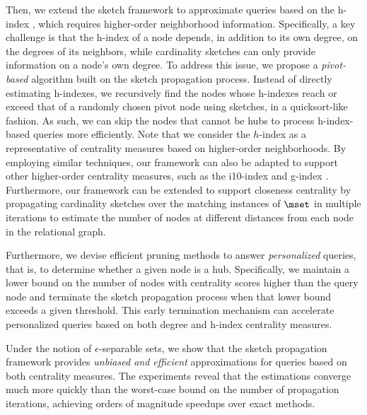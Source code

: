 Then, we extend the sketch framework to approximate \ced queries based on the h-index \cite{LuZZS16}, which requires higher-order neighborhood information. Specifically, a key challenge is that the h-index of a node depends, in addition to its own degree, on the degrees of its neighbors, while cardinality sketches can only provide information on a node's own degree. To address this issue, we propose a \emph{pivot-based} algorithm built on the sketch propagation process. Instead of directly estimating h-indexes, we recursively find the nodes whose h-indexes reach or exceed that of a randomly chosen pivot node using sketches, in a quicksort-like fashion. As such, we can skip the nodes that cannot be hubs to process h-index-based \ced queries more efficiently. Note that we consider the $h$-index as a representative of centrality measures based on higher-order neighborhoods. By employing similar techniques, our framework can also be adapted to support other higher-order centrality measures, such as the i10-index and g-index \cite{egghe2006theory}. Furthermore, our framework can be extended to support closeness centrality \cite{olsen2014efficient, bergamini2019computing} by propagating cardinality sketches over the matching instances of $\mset$ in multiple iterations to estimate the number of nodes at different distances from each node in the relational graph.

Furthermore, we devise efficient pruning methods to answer \emph{personalized} \ced queries, that is, to determine whether a given node is a hub. Specifically, we maintain a lower bound on the number of nodes with centrality scores higher than the query node and terminate the sketch propagation process when that lower bound exceeds a given threshold. This early termination mechanism can accelerate personalized \ced queries based on both degree and h-index centrality measures.

Under the notion of $\epsilon$-separable sets, we show that the sketch propagation framework provides \emph{unbiased and efficient} approximations for \ced queries based on both centrality measures. The experiments reveal that the estimations converge much more quickly than the worst-case bound on the number of propagation iterations, achieving orders of magnitude speedups over exact methods.

